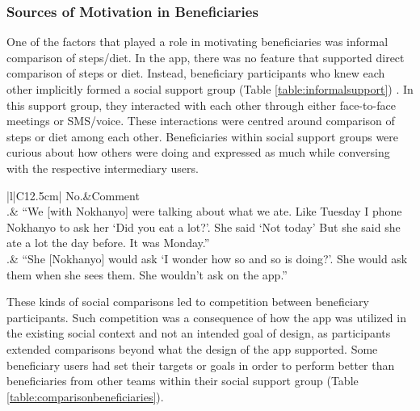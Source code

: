 \subsubsection{Sources of Motivation in Beneficiaries}
One of the factors that played a role in motivating beneficiaries was informal comparison of steps/diet. In the app, there was no feature that supported direct comparison of steps or diet. Instead, beneficiary participants who knew each other implicitly formed a social support group (Table \ref{table:informalsupport}) . In this support group, they interacted with each other through either face-to-face meetings or SMS/voice. These interactions were centred around comparison of steps or diet among each other. Beneficiaries within social support groups were curious about how others were doing and expressed as much while conversing with the respective intermediary users.

\begin{table}[h!]
\renewcommand{\baselinestretch}{1.5}
  \begin{center}
    \caption{Excerpts: examples for existence of informal social support groups for beneficiaries.}
    \label{table:informalsupport}
	\begin{tabular}{|l|C{12.5cm}|}
		\hline
		No.&Comment\\
		.& {``We [with Nokhanyo] were talking about what we ate. Like Tuesday I phone Nokhanyo to ask her `Did you eat a lot?'. She said `Not today' But she said she ate a lot the day before. It was Monday.''}\\
		.& {``She [Nokhanyo] would ask `I wonder how so and so is doing?'. She would ask them when she sees them. She wouldn't ask on the app.''}\\
		\hline
	\end{tabular}
  \end{center}
\end{table}

These kinds of social comparisons led to competition between beneficiary participants. Such competition was a consequence of how the app was utilized in the existing social context and not an intended goal of design, as participants extended comparisons beyond what the design of the app supported. Some beneficiary users had set their targets or goals in order to perform better than beneficiaries from other teams within their social support group (Table \ref{table:comparisonbeneficiaries}).

